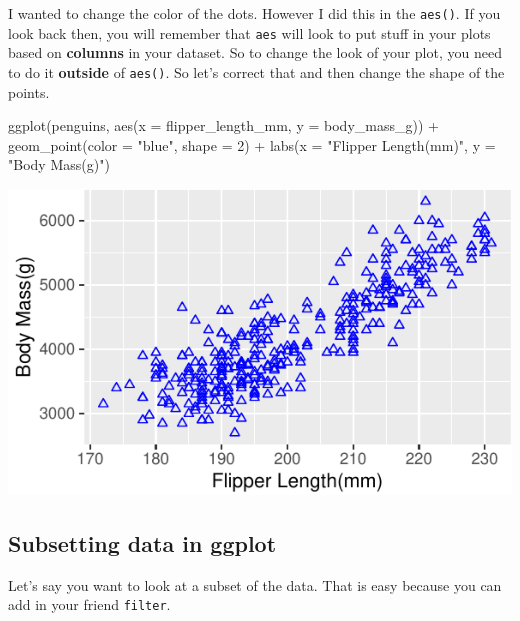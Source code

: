 \documentclass[]{tufte-handout}
\newenvironment{Shaded}{}{}
\newcommand{\AttributeTok}[1]{\textcolor[rgb]{0.49,0.56,0.16}{#1}}
\newcommand{\DecValTok}[1]{\textcolor[rgb]{0.25,0.63,0.44}{#1}}
\newcommand{\FunctionTok}[1]{\textcolor[rgb]{0.02,0.16,0.49}{#1}}
\newcommand{\NormalTok}[1]{#1}
\newcommand{\SpecialCharTok}[1]{\textcolor[rgb]{0.25,0.44,0.63}{#1}}
\newcommand{\StringTok}[1]{\textcolor[rgb]{0.25,0.44,0.63}{#1}}
\begin{document}
I wanted to change the color of the dots. However I did this in the
\texttt{aes()}. If you look back then, you will remember that
\texttt{aes} will look to put stuff in your plots based on
\textbf{columns} in your dataset. So to change the look of your plot,
you need to do it \textbf{outside} of \texttt{aes()}. So let's correct
that and then change the shape of the points.

\begin{Shaded}
\begin{Highlighting}[]
\FunctionTok{ggplot}\NormalTok{(penguins, }\FunctionTok{aes}\NormalTok{(}\AttributeTok{x =}\NormalTok{ flipper\_length\_mm, }\AttributeTok{y =}\NormalTok{ body\_mass\_g)) }\SpecialCharTok{+}
  \FunctionTok{geom\_point}\NormalTok{(}\AttributeTok{color =} \StringTok{"blue"}\NormalTok{, }\AttributeTok{shape =} \DecValTok{2}\NormalTok{) }\SpecialCharTok{+}
  \FunctionTok{labs}\NormalTok{(}\AttributeTok{x =} \StringTok{"Flipper Length(mm)"}\NormalTok{, }\AttributeTok{y =} \StringTok{"Body Mass(g)"}\NormalTok{)}
\end{Highlighting}
\end{Shaded}

\begin{center}\includegraphics{R-Guide_files/figure-latex/real-changes-1} \end{center}

\hypertarget{subsetting-data-in-ggplot}{%
\subsection{Subsetting data in ggplot}\label{subsetting-data-in-ggplot}}

Let's say you want to look at a subset of the data. That is easy because
you can add in your friend \texttt{filter}.
\end{document}
